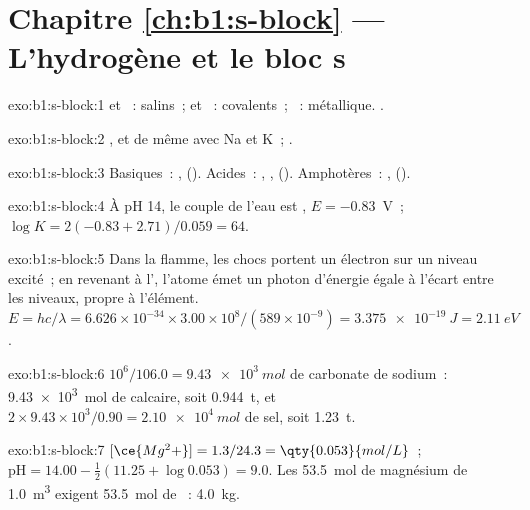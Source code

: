 \section*{Chapitre \ref{ch:b1:s-block} --- L'hydrogène et le bloc s}

\begin{solution}{exo:b1:s-block:1}
 et ~: salins~;  et ~: covalents~;
~: métallique. .
\end{solution}

\begin{solution}{exo:b1:s-block:2}
, et de même avec Na et K~;
.
\end{solution}

\begin{solution}{exo:b1:s-block:3}
Basiques~: ,  ().
Acides~:
, ,  (). Amphotères~:
,  ().
\end{solution}

\begin{solution}{exo:b1:s-block:4}
À pH 14, le couple de l'eau est , $E = -0.83$~V~;
$\log K = 2(-0.83 + 2.71)/0.059 = 64$.
\end{solution}

\begin{solution}{exo:b1:s-block:5}
Dans la flamme, les chocs portent un électron sur un niveau excité~; en
revenant à l', l'atome émet un photon d'énergie égale à
l'écart entre les niveaux, propre à l'élément. $E = hc/\lambda = 6.626 \times 10^{-34} \times
3.00 \times 10^8/(589 \times 10^{-9}) = \qty{3.375e-19}{J} = \qty{2.11}{eV}$.
\end{solution}

\begin{solution}{exo:b1:s-block:6}
$10^6/106.0 = \qty{9.43e3}{mol}$ de carbonate de sodium~:
\qty{9.43e3}{mol} de calcaire, soit \qty{0.944}{t}, et $2 \times 9.43 \times 10^3/0.90 =
\qty{2.10e4}{mol}$ de sel, soit \qty{1.23}{t}.
\end{solution}

\begin{solution}{exo:b1:s-block:7}
$[\ce{Mg^2+}] = 1.3/24.3 = \qty{0.053}{mol/L}$~; $\mathrm{pH} = 14.00 -
\frac12(11.25 + \log 0.053) = 9.0$. Les \qty{53.5}{mol} de magnésium de
\qty{1.0}{m^3} exigent \qty{53.5}{mol} de ~: \qty{4.0}{kg}.
\end{solution}

